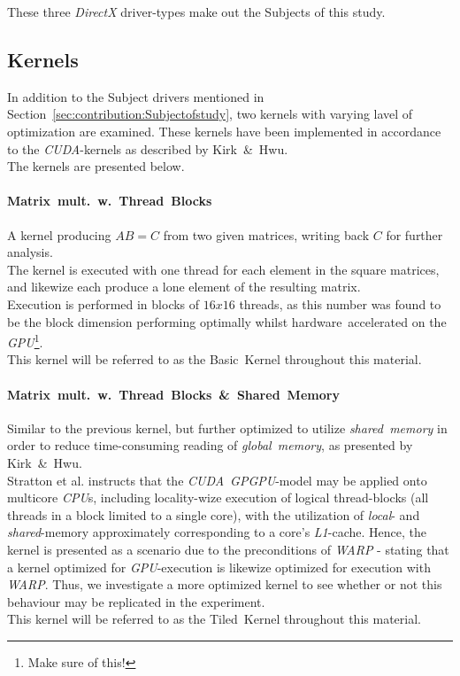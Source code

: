 \documentclass[fleqn,10pt]{SelfArx} %
\begin{document}
\noindent
These three \textit{DirectX} driver-types make out the Subjects of this study.

\subsection{Kernels}
\label{sec:contribution:kernels}
In addition to the Subject drivers mentioned in Section~\ref{sec:contribution:Subjectofstudy}, two kernels with varying lavel of optimization are examined. These kernels have been implemented in accordance to the \textit{CUDA}-kernels as described by Kirk~\&~Hwu\cite[p.~67, p.~87]{Kirk:2010:PMP:1841511}.\\
The kernels are presented below.
\paragraph{Matrix~mult.~w.~Thread~Blocks}
	A kernel producing $AB=C$ from two given matrices, writing back $C$ for further analysis.\\
	The kernel is executed with one thread for each element in the square matrices, and likewize each produce a lone element of the resulting matrix.\\
	Execution is performed in blocks of $16x16$ threads, as this number was found to be the block dimension performing optimally whilst hardware~accelerated on the \textit{GPU}\footnote{Make sure of this!}.  \\
	This kernel will be referred to as the Basic~Kernel throughout this material.
\paragraph{Matrix~mult.~w.~Thread~Blocks~\&~Shared~Memory}
	Similar to the previous kernel, but further optimized to utilize \textit{shared~memory} in order to reduce time-consuming reading of \textit{global~memory}, as presented by Kirk~\&~Hwu\cite[p.~77-93]{Kirk:2010:PMP:1841511}.\\
		Stratton et al.\cite[p.~1-3]{Stratton:2008:MEI:1485701.1485703} instructs that the \textit{CUDA}~\textit{GPGPU}-model may be applied onto multicore \textit{CPU}s, including locality-wize execution of logical thread-blocks (all threads in a block limited to a single core), with the utilization of \textit{local}- and \textit{shared}-memory approximately corresponding to a core's \textit{L1}-cache. Hence, the kernel is presented as a scenario due to the preconditions of \textit{WARP} - stating that a kernel optimized for \textit{GPU}-execution is likewize optimized for execution with \textit{WARP}. Thus, we investigate a more optimized kernel to see whether or not this behaviour may be replicated in the experiment.\\
	This kernel will be referred to as the Tiled~Kernel throughout this material.\\
\end{document}
